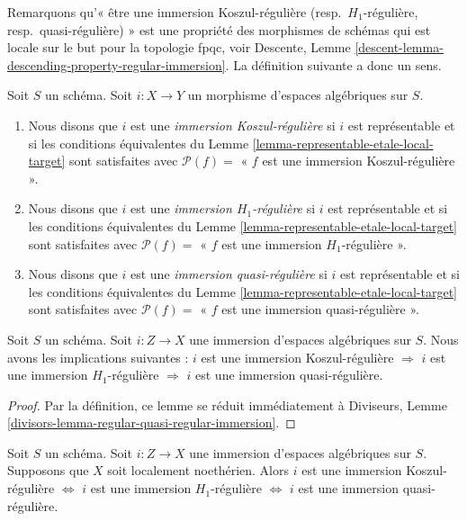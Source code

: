 \noindent
Remarquons qu'« être une immersion Koszul-régulière (resp.\ $H_1$-régulière,
resp.\ quasi-régulière) » est une propriété des morphismes de schémas qui est locale
sur le but pour la topologie fpqc, voir
Descente, Lemme \ref{descent-lemma-descending-property-regular-immersion}.
La définition suivante a donc un sens.

\begin{definition}
\label{definition-regular-immersion}
Soit $S$ un schéma. Soit $i : X \to Y$ un morphisme d'espaces
algébriques sur $S$.
\begin{enumerate}
\item Nous disons que $i$ est une {\it immersion Koszul-régulière} si $i$ est représentable
et si les conditions équivalentes du
Lemme \ref{lemma-representable-etale-local-target}
sont satisfaites avec $\mathcal{P}(f) =$ « $f$ est une immersion Koszul-régulière ».
\item Nous disons que $i$ est une {\it immersion $H_1$-régulière} si $i$ est représentable
et si les conditions équivalentes du
Lemme \ref{lemma-representable-etale-local-target}
sont satisfaites avec $\mathcal{P}(f) =$ « $f$ est une immersion $H_1$-régulière ».
\item Nous disons que $i$ est une {\it immersion quasi-régulière} si $i$ est représentable
et si les conditions équivalentes du
Lemme \ref{lemma-representable-etale-local-target}
sont satisfaites avec $\mathcal{P}(f) =$ « $f$ est une immersion quasi-régulière ».
\end{enumerate}
\end{definition}

\begin{lemma}
\label{lemma-regular-quasi-regular-immersion}
Soit $S$ un schéma.
Soit $i : Z \to X$ une immersion d'espaces algébriques sur $S$.
Nous avons les implications suivantes :
$i$ est une immersion Koszul-régulière $\Rightarrow$
$i$ est une immersion $H_1$-régulière $\Rightarrow$
$i$ est une immersion quasi-régulière.
\end{lemma}

\begin{proof}
Par la définition, ce lemme se réduit immédiatement à
Diviseurs, Lemme \ref{divisors-lemma-regular-quasi-regular-immersion}.
\end{proof}

\begin{lemma}
\label{lemma-regular-immersion-noetherian}
Soit $S$ un schéma.
Soit $i : Z \to X$ une immersion d'espaces algébriques sur $S$.
Supposons que $X$ soit localement noethérien. Alors
$i$ est une immersion Koszul-régulière $\Leftrightarrow$
$i$ est une immersion $H_1$-régulière $\Leftrightarrow$
$i$ est une immersion quasi-régulière.
\end{lemma}

